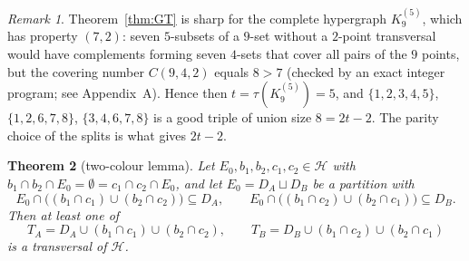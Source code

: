 \documentclass[11pt]{amsart}
\newtheorem{theorem}{Theorem}[section]
\theoremstyle{definition}
\theoremstyle{remark}
\newtheorem{remark}[theorem]{Remark}
\newcommand{\cH}{\mathcal H}
\begin{document}
\begin{remark}
Theorem~\ref{thm:GT} is sharp for the complete hypergraph $K^{(5)}_9$, which has property $(7,2)$: seven $5$-subsets of a $9$-set without a $2$-point transversal would have complements forming seven $4$-sets that cover all pairs of the $9$ points, but the covering number $C(9,4,2)$ equals $8>7$ (checked by an exact integer program; see Appendix~A). Hence then $t=\tau(K^{(5)}_9)=5$, and $\{1,2,3,4,5\}$, $\{1,2,6,7,8\}$, $\{3,4,6,7,8\}$ is a good triple of union size $8=2t-2$. The parity choice of the splits is what gives $2t-2$.
\end{remark}

\begin{theorem}[two-colour lemma]\label{thm:TC}
Let $E_0,b_1,b_2,c_1,c_2\in\cH$ with $b_1\cap b_2\cap E_0=\emptyset=c_1\cap c_2\cap E_0$, and let $E_0=D_A\sqcup D_B$ be a partition with
\[
E_0\cap\bigl((b_1\cap c_1)\cup(b_2\cap c_2)\bigr)\subseteq D_A,\qquad E_0\cap\bigl((b_1\cap c_2)\cup(b_2\cap c_1)\bigr)\subseteq D_B .
\]
Then at least one of
\[
T_A=D_A\cup(b_1\cap c_1)\cup(b_2\cap c_2),\qquad T_B=D_B\cup(b_1\cap c_2)\cup(b_2\cap c_1)
\]
is a transversal of $\cH$.
\end{theorem}
\end{document}
